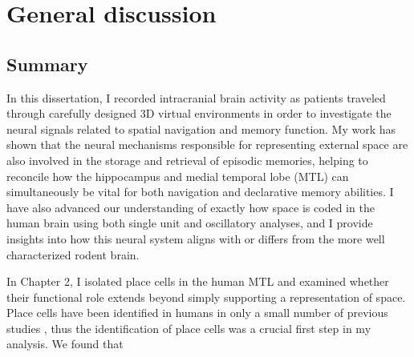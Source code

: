 \chapter{General discussion}
\large

\section{Summary}

In this dissertation, I recorded intracranial brain activity as patients traveled through carefully designed 3D virtual environments in order to investigate the neural signals related to spatial navigation and memory function. My work has shown that the neural mechanisms responsible for representing external space are also involved in the storage and retrieval of episodic memories, helping to reconcile how the hippocampus and medial temporal lobe (MTL) can simultaneously be vital for both navigation and declarative memory abilities. I have also advanced our understanding of exactly how space is coded in the human brain using both single unit and oscillatory analyses, and I provide insights into how this neural system aligns with or differs from the more well characterized rodent brain. 

In Chapter 2, I isolated place cells in the human MTL and examined whether their functional role extends beyond simply supporting a representation of space. Place cells have been identified in humans in only a small number of previous studies \citep{EkstEtal03,JacoEtal10}, thus the identification of place cells was a crucial first step in my analysis. We found that 





